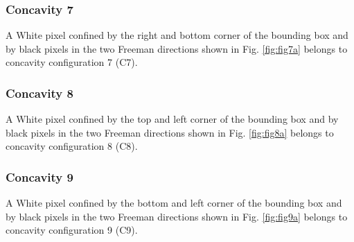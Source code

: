 \documentclass[conference]{IEEEtran}
\begin{document}
\subsubsection{Concavity 7}
 A White pixel confined by the right and bottom corner of the bounding box and by black pixels in the two Freeman directions shown in Fig.  \ref{fig:fig7a} belongs to concavity configuration 7 (C7).%
\subsubsection{Concavity 8}
A White pixel confined by the top and left corner of the bounding box and by black pixels in the two Freeman directions shown in Fig.  \ref{fig:fig8a} belongs to concavity configuration 8 (C8).%

\subsubsection{Concavity 9}
 A White pixel confined by the bottom and left corner of the bounding box and by black pixels in the two Freeman directions shown in Fig.  \ref{fig:fig9a} belongs to concavity configuration 9 (C9). %







\end{document}
